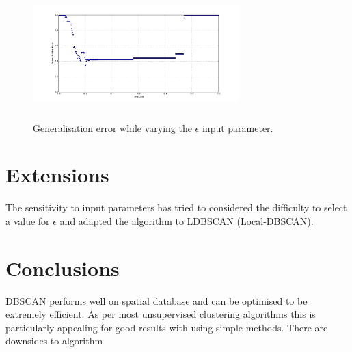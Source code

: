 \documentclass{ecsarticle}     %
\begin{document}
\begin{figure}[ht]
   \centering
    \includegraphics[height = 5cm,width = 8cm]{error.pdf}
   \caption{Generalisation error while varying the $\epsilon$ input parameter.}
   \label{fig:error}
\end{figure}




\section{Extensions}

The sensitivity to input parameters has tried to 
\cite{lian07ldbscan} considered the difficulty to select a value for $\epsilon$ and adapted the algorithm to LDBSCAN (Local-DBSCAN).

\section{Conclusions}
DBSCAN performs well on spatial database and can be optimised to be extremely efficient.
As per most unsupervised clustering algorithms this is particularly appealing for good results with using simple methods. 
There are downsides to algorithm



\end{document}

